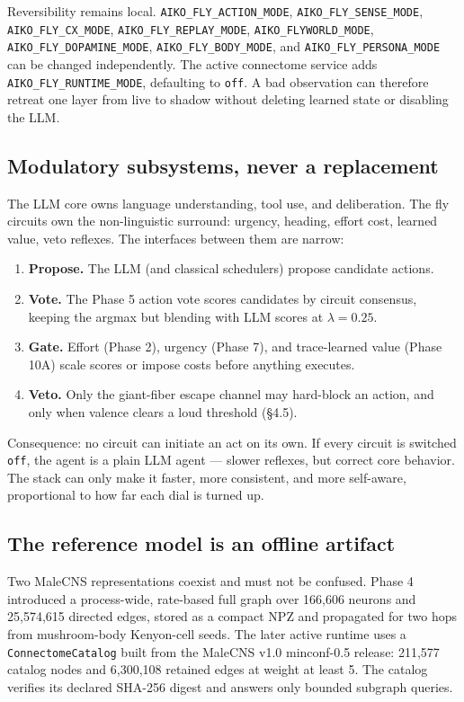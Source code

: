 \documentclass[11pt]{article}
\begin{document}
Reversibility remains local. \texttt{AIKO\_FLY\_ACTION\_MODE}, \texttt{AIKO\_FLY\_SENSE\_MODE}, \texttt{AIKO\_FLY\_CX\_MODE}, \texttt{AIKO\_FLY\_REPLAY\_MODE}, \texttt{AIKO\_FLYWORLD\_MODE}, \texttt{AIKO\_FLY\_DOPAMINE\_MODE}, \texttt{AIKO\_FLY\_BODY\_MODE}, and \texttt{AIKO\_FLY\_PERSONA\_MODE} can be changed independently. The active connectome service adds \texttt{AIKO\_FLY\_RUNTIME\_MODE}, defaulting to \texttt{off}. A bad observation can therefore retreat one layer from live to shadow without deleting learned state or disabling the LLM.

\subsection{Modulatory subsystems, never a replacement}

The LLM core owns language understanding, tool use, and deliberation. The fly circuits own the non-linguistic surround: urgency, heading, effort cost, learned value, veto reflexes. The interfaces between them are narrow:

\begin{enumerate}[leftmargin=*]
\item \textbf{Propose.} The LLM (and classical schedulers) propose candidate actions.
\item \textbf{Vote.} The Phase 5 action vote scores candidates by circuit consensus, keeping the argmax but blending with LLM scores at \(\lambda = 0.25\).
\item \textbf{Gate.} Effort (Phase 2), urgency (Phase 7), and trace-learned value (Phase 10A) scale scores or impose costs before anything executes.
\item \textbf{Veto.} Only the giant-fiber escape channel may hard-block an action, and only when valence clears a loud threshold (§4.5).
\end{enumerate}

Consequence: no circuit can initiate an act on its own. If every circuit is switched \texttt{off}, the agent is a plain LLM agent — slower reflexes, but correct core behavior. The stack can only make it faster, more consistent, and more self-aware, proportional to how far each dial is turned up.

\subsection{The reference model is an offline artifact}

Two MaleCNS representations coexist and must not be confused. Phase 4 introduced a process-wide, rate-based full graph over 166,606 neurons and 25,574,615 directed edges, stored as a compact NPZ and propagated for two hops from mushroom-body Kenyon-cell seeds. The later active runtime uses a \texttt{ConnectomeCatalog} built from the MaleCNS v1.0 minconf-0.5 release: 211,577 catalog nodes and 6,300,108 retained edges at weight at least 5. The catalog verifies its declared SHA-256 digest and answers only bounded subgraph queries.
\end{document}
